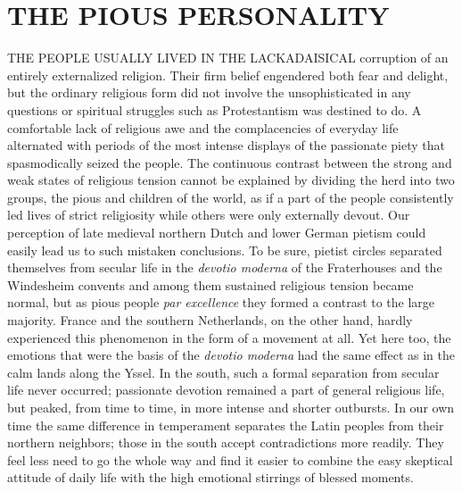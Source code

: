 \chapter{THE PIOUS PERSONALITY}

THE PEOPLE USUALLY LIVED IN THE LACKADAISICAL corruption of an entirely
externalized religion. Their firm belief engendered both fear and
delight, but the ordinary religious form did not involve the
unsophisticated in any questions or spiritual struggles such as
Protestantism was destined to do. A comfortable lack of religious awe
and the complacencies of everyday life alternated with periods of the
most intense displays of the passionate piety that spasmodically seized
the people. The continuous contrast between the strong and weak states
of religious tension cannot be explained by dividing the herd into two
groups, the pious and children of the world, as if a part of the people
consistently led lives of strict religiosity while others were only
externally devout. Our perception of late medieval northern Dutch and
lower German pietism could easily lead us to such mistaken conclusions.
To be sure, pietist circles separated themselves from secular life in
the \emph{devotio moderna} of the Fraterhouses and the Windesheim
convents and among them sustained religious tension became normal, but
as pious people \emph{par excellence} they formed a contrast to the
large majority. France and the southern Netherlands, on the other hand,
hardly experienced this phenomenon in the form of a movement at all. Yet
here too, the emotions that were the basis of the \emph{devotio moderna}
had the same effect as in the calm lands along the Yssel. In the south,
such a formal separation from secular life never occurred; passionate
devotion remained a part of general religious life, but peaked, from
time to time, in more intense and shorter outbursts. In our own time the
same difference in temperament separates the Latin peoples from their
northern neighbors; those in the south accept contradictions more
readily. They feel less need to go the whole way and find it easier to
combine the easy skeptical attitude of daily life with the high
emotional stirrings of blessed moments.

